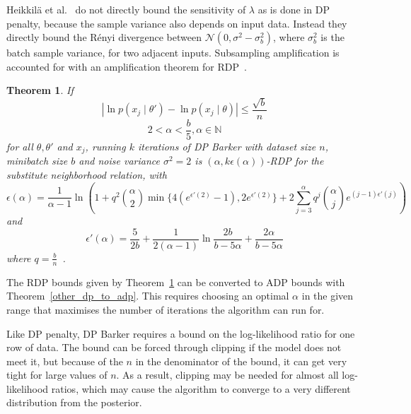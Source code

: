 \documentclass[english,twoside,openright]{HYgraduMLDS}
\newtheorem{theorem}[lemma]{Theorem}
\newcommand{\N}{\mathbb{N}}
\newcommand{\caln}{{\mathcal{N}}}
\begin{document}
Heikkilä et al.~\cite{HeikkilaJDH19} do not directly bound the sensitivity
of \(\lambda\) as is done in DP penalty, because the sample variance also 
depends on input data. Instead they directly bound the Rényi divergence 
between \(\caln(0, \sigma^2 - \sigma^2_b)\), where \(\sigma^2_b\) is the 
batch sample variance, for two adjacent inputs. Subsampling amplification 
is accounted for with an amplification theorem for RDP~\cite{WangBK19}.

\begin{theorem}\label{dp_barker_theorem}
    If
    \[
        |\ln p(x_j\mid \theta') - \ln p(x_j\mid \theta)| \leq \frac{\sqrt{b}}{n}
    \]
    \[
        2 < \alpha < \frac{b}{5}, \alpha \in \N
    \]
    for all \(\theta, \theta'\) and \(x_{j}\),
    running \(k\) iterations of DP Barker with dataset size \(n\),
    minibatch size \(b\) and noise variance \(\sigma^{2} = 2\)
    is \((\alpha, k\epsilon(\alpha))\)-RDP for the substitute neighborhood
    relation, with
    \[
        \epsilon(\alpha) = \frac{1}{\alpha - 1}\ln \left(
        1 + q^2\binom{\alpha}{2}\min\{4(e^{\epsilon'(2)} - 1), 2e^{\epsilon'(2)}\}
        + 2 \sum_{j=3}^\alpha q^j\binom{\alpha}{j}e^{(j-1)\epsilon'(j)}\right)
    \]
    and 
    \[
        \epsilon'(\alpha) = \frac{5}{2b} + \frac{1}{2(\alpha - 1)}
        \ln \frac{2b}{b - 5\alpha} + \frac{2\alpha}{b - 5\alpha}
    \]
    where \(q = \frac{b}{n}\)~\cite{HeikkilaJDH19}.
\end{theorem}
The RDP bounds given by Theorem~\ref{dp_barker_theorem} can be converted to
ADP bounds with Theorem~\ref{other_dp_to_adp}. This requires choosing an
optimal \(\alpha\) in the given range that maximises the number of iterations
the algorithm can run for.


Like DP penalty, DP Barker requires a bound on the log-likelihood ratio for
one row of data. The bound can be forced through clipping if the model does not 
meet it, but because of the \(n\) in the denominator of the bound, it can get 
very tight for large values of \(n\). As a result, clipping may be needed for 
almost all log-likelihood ratios, which may cause the algorithm to converge
to a very different distribution from the posterior.
\end{document}
